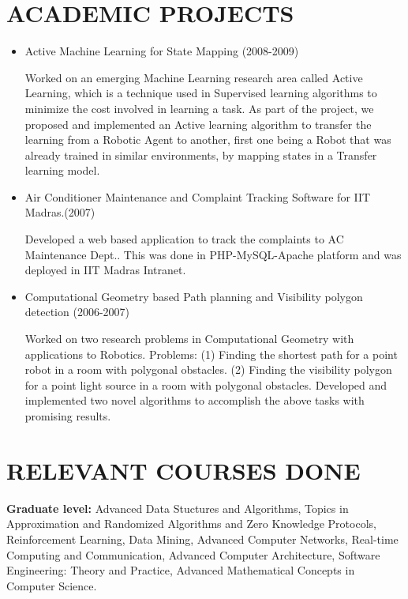 \documentclass{res}
\begin{document}
\begin{resume}
\section{ACADEMIC PROJECTS}
\begin{itemize}

\item {Active Machine Learning for State Mapping (2008-2009)}

Worked on an emerging Machine Learning research area called Active Learning, which is a technique used in Supervised learning algorithms to minimize the cost involved in learning a task. As part of the project, we proposed and implemented an Active learning algorithm to transfer the learning from a Robotic Agent to another, first one being a Robot that was already trained in similar environments, by mapping states in a Transfer learning model.

\item {Air Conditioner Maintenance and Complaint Tracking Software for IIT Madras.(2007)}

Developed a web based application to track the complaints to AC Maintenance Dept.. This was done in PHP-MySQL-Apache platform and was deployed in IIT Madras Intranet.

\item {Computational Geometry based Path planning and Visibility polygon detection (2006-2007)}

Worked on two research problems in Computational Geometry with applications to Robotics. Problems: (1) Finding the shortest path for a point robot in a room with polygonal obstacles. (2) Finding the visibility polygon for a point light source in a room with polygonal obstacles. Developed and implemented two novel algorithms to accomplish the above tasks with promising results.

\end{itemize}
  
\section{RELEVANT COURSES DONE}

\textbf{Graduate level:} 
Advanced Data Stuctures and Algorithms, 
Topics in Approximation and Randomized Algorithms and Zero Knowledge Protocols, 
Reinforcement Learning, 
Data Mining, 
Advanced Computer Networks, 
Real-time Computing and Communication, 
Advanced Computer Architecture, 
Software Engineering: Theory and Practice, 
Advanced Mathematical Concepts in Computer Science.


\end{resume}
\end{document}
